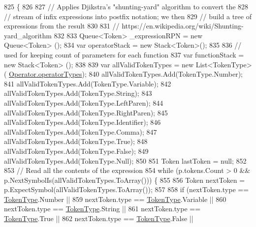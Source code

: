 \begin{DoxyCode}
825                                                                          \{
826 
827                 \textcolor{comment}{// Applies Djikstra's "shunting-yard" algorithm to convert the }
828                 \textcolor{comment}{// stream of infix expressions into postfix notation; we then}
829                 \textcolor{comment}{// build a tree of expressions from the result}
830 
831                 \textcolor{comment}{// https://en.wikipedia.org/wiki/Shunting-yard\_algorithm}
832 
833                 Queue<Token> \_expressionRPN = \textcolor{keyword}{new} Queue<Token> ();
834                 var operatorStack = \textcolor{keyword}{new} Stack<Token>();
835 
836                 \textcolor{comment}{// used for keeping count of parameters for each function}
837                 var functionStack = \textcolor{keyword}{new} Stack<Token> (); 
838 
839                 var allValidTokenTypes = \textcolor{keyword}{new} List<TokenType>(
      \hyperlink{a00115_a8dca7db3b76b8c358aba6068274e07df}{Operator.operatorTypes});
840                 allValidTokenTypes.Add(TokenType.Number);
841                 allValidTokenTypes.Add(TokenType.Variable);
842                 allValidTokenTypes.Add(TokenType.String);
843                 allValidTokenTypes.Add(TokenType.LeftParen);
844                 allValidTokenTypes.Add(TokenType.RightParen);
845                 allValidTokenTypes.Add(TokenType.Identifier);
846                 allValidTokenTypes.Add(TokenType.Comma);
847                 allValidTokenTypes.Add(TokenType.True);
848                 allValidTokenTypes.Add(TokenType.False);
849                 allValidTokenTypes.Add(TokenType.Null);
850 
851                 Token lastToken = null;
852 
853                 \textcolor{comment}{// Read all the contents of the expression}
854                 \textcolor{keywordflow}{while} (p.tokens.Count > 0 && p.NextSymbolIs(allValidTokenTypes.ToArray())) \{
855 
856                     Token nextToken = p.ExpectSymbol(allValidTokenTypes.ToArray());
857 
858                     \textcolor{keywordflow}{if} (nextToken.type == \hyperlink{a00029_a301aa7c866593a5b625a8fc158bbeace}{TokenType}.Number ||
859                         nextToken.type == \hyperlink{a00029_a301aa7c866593a5b625a8fc158bbeace}{TokenType}.Variable ||
860                         nextToken.type == \hyperlink{a00029_a301aa7c866593a5b625a8fc158bbeace}{TokenType}.String ||
861                         nextToken.type == \hyperlink{a00029_a301aa7c866593a5b625a8fc158bbeace}{TokenType}.True ||
862                         nextToken.type == \hyperlink{a00029_a301aa7c866593a5b625a8fc158bbeace}{TokenType}.False ||

\end{DoxyCode}

